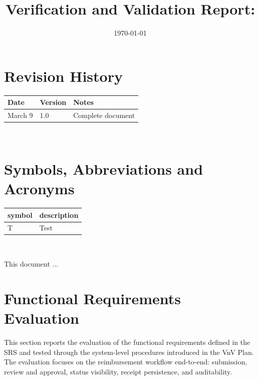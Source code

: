 \documentclass[12pt, titlepage]{article}
\begin{document}
\title{Verification and Validation Report: \progname} 
\author{\authname}
\date{\today}
	
\maketitle


\section{Revision History}

\begin{tabularx}{\textwidth}{p{3cm}p{2cm}X}
\toprule {\bf Date} & {\bf Version} & {\bf Notes}\\
\midrule
March 9 & 1.0 & Complete document\\
\bottomrule
\end{tabularx}

~\newpage

\section{Symbols, Abbreviations and Acronyms}

\renewcommand{\arraystretch}{1.2}
\begin{tabular}{l l} 
  \toprule		
  \textbf{symbol} & \textbf{description}\\
  \midrule 
  T & Test\\
  \bottomrule
\end{tabular}\\


\newpage

\tableofcontents

\listoftables %

\listoffigures %

\newpage


This document ...

\section{Functional Requirements Evaluation}

This section reports the evaluation of the functional requirements defined in the
SRS and tested through the system-level procedures introduced in the VnV Plan.
The evaluation focuses on the reimbursement workflow end-to-end: submission,
review and approval, status visibility, receipt persistence, and auditability.
\end{document}
